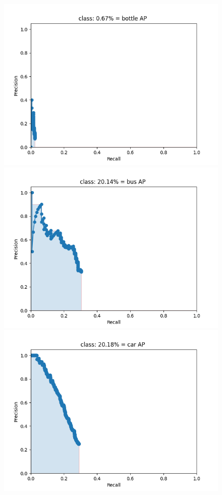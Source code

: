 \documentclass{article}%
\begin{document}
\begin{figure}[H]
    \centering
	\begin{minipage}{0.24\linewidth}
		\centering
		\includegraphics[width=0.9\linewidth]{fast_rcnn/mAP_output/classes/bottle.png}
	\end{minipage}
	\begin{minipage}{0.24\linewidth}
		\centering
		\includegraphics[width=0.9\linewidth]{fast_rcnn/mAP_output/classes/bus.png}
	\end{minipage}
    \begin{minipage}{0.24\linewidth}
		\centering
		\includegraphics[width=0.9\linewidth]{fast_rcnn/mAP_output/classes/car.png}

\end{minipage}
\end{figure}
\end{document}
